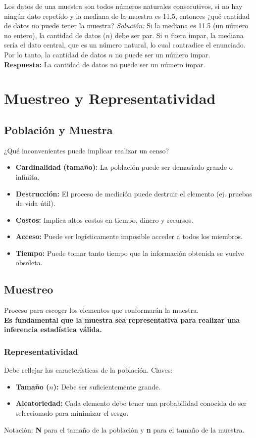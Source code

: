 \documentclass[12pt, letterpaper]{article}
\begin{document}
\vspace{1em}
\noindent Los datos de una muestra son todos números naturales consecutivos, si no hay ningún dato repetido y la mediana de la muestra es 11.5, entonces ¿qué cantidad de datos no puede tener la muestra?
\textit{Solución:}
Si la mediana es 11.5 (un número no entero), la cantidad de datos ($n$) debe ser par. Si $n$ fuera impar, la mediana sería el dato central, que es un número natural, lo cual contradice el enunciado.
Por lo tanto, la cantidad de datos $n$ no puede ser un número impar. \\
\textbf{Respuesta:} La cantidad de datos no puede ser un número impar.
\newpage

\section{Muestreo y Representatividad}
\subsection{Población y Muestra}
¿Qué inconvenientes puede implicar realizar un censo?
\begin{itemize}
	\item \textbf{Cardinalidad (tamaño):} La población puede ser demasiado grande o infinita.
	\item \textbf{Destrucción:} El proceso de medición puede destruir el elemento (ej. pruebas de vida útil).
	\item \textbf{Costos:} Implica altos costos en tiempo, dinero y recursos.
	\item \textbf{Acceso:} Puede ser logísticamente imposible acceder a todos los miembros.
	\item \textbf{Tiempo:} Puede tomar tanto tiempo que la información obtenida se vuelve obsoleta.
\end{itemize}

\subsection{Muestreo}
Proceso para escoger los elementos que conformarán la muestra. \\
\textbf{Es fundamental que la muestra sea representativa para realizar una inferencia estadística válida.}

\subsubsection{Representatividad}
Debe reflejar las características de la población. Claves:
\begin{itemize}
	\item \textbf{Tamaño ($n$):} Debe ser suficientemente grande.
	\item \textbf{Aleatoriedad:} Cada elemento debe tener una probabilidad conocida de ser seleccionado para minimizar el sesgo.
\end{itemize}
Notación: \textbf{N} para el tamaño de la población y \textbf{n} para el tamaño de la muestra.
\end{document}
